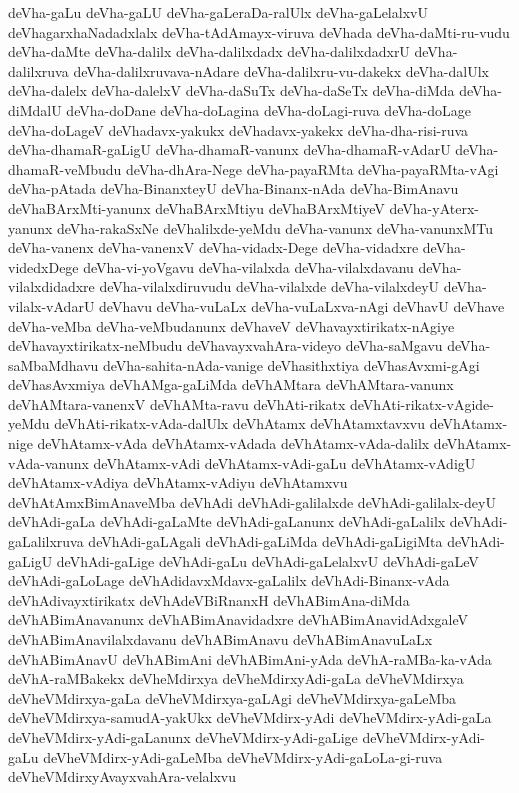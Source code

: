 {deVha-gaLu
deVha-gaLU
deVha-gaLeraDa-ralUlx
deVha-gaLelalxvU
deVhagarxhaNadadxlalx
deVha-tAdAmayx-viruva
deVhada
deVha-daMti-ru-vudu
deVha-daMte
deVha-dalilx
deVha-dalilxdadx
deVha-dalilxdadxrU
deVha-dalilxruva
deVha-dalilxruvava-nAdare
deVha-dalilxru-vu-dakekx
deVha-dalUlx
deVha-dalelx
deVha-dalelxV
deVha-daSuTx
deVha-daSeTx
deVha-diMda
deVha-diMdalU
deVha-doDane
deVha-doLagina
deVha-doLagi-ruva
deVha-doLage
deVha-doLageV
deVhadavx-yakukx
deVhadavx-yakekx
deVha-dha-risi-ruva
deVha-dhamaR-gaLigU
deVha-dhamaR-vanunx
deVha-dhamaR-vAdarU
deVha-dhamaR-veMbudu
deVha-dhAra-Nege
deVha-payaRMta
deVha-payaRMta-vAgi
deVha-pAtada
deVha-BinanxteyU
deVha-Binanx-nAda
deVha-BimAnavu
deVhaBArxMti-yanunx
deVhaBArxMtiyu
deVhaBArxMtiyeV
deVha-yAterx-yanunx
deVha-rakaSxNe
deVhalilxde-yeMdu
deVha-vanunx
deVha-vanunxMTu
deVha-vanenx
deVha-vanenxV
deVha-vidadx-Dege
deVha-vidadxre
deVha-videdxDege
deVha-vi-yoVgavu
deVha-vilalxda
deVha-vilalxdavanu
deVha-vilalxdidadxre
deVha-vilalxdiruvudu
deVha-vilalxde
deVha-vilalxdeyU
deVha-vilalx-vAdarU
deVhavu
deVha-vuLaLx
deVha-vuLaLxva-nAgi
deVhavU
deVhave
deVha-veMba
deVha-veMbudanunx
deVhaveV
deVhavayxtirikatx-nAgiye
deVhavayxtirikatx-neMbudu
deVhavayxvahAra-videyo
deVha-saMgavu
deVha-saMbaMdhavu
deVha-sahita-nAda-vanige
deVhasithxtiya
deVhasAvxmi-gAgi
deVhasAvxmiya
deVhAMga-gaLiMda
deVhAMtara
deVhAMtara-vanunx
deVhAMtara-vanenxV
deVhAMta-ravu
deVhAti-rikatx
deVhAti-rikatx-vAgide-yeMdu
deVhAti-rikatx-vAda-dalUlx
deVhAtamx
deVhAtamxtavxvu
deVhAtamx-nige
deVhAtamx-vAda
deVhAtamx-vAdada
deVhAtamx-vAda-dalilx
deVhAtamx-vAda-vanunx
deVhAtamx-vAdi
deVhAtamx-vAdi-gaLu
deVhAtamx-vAdigU
deVhAtamx-vAdiya
deVhAtamx-vAdiyu
deVhAtamxvu
deVhAtAmxBimAnaveMba
deVhAdi
deVhAdi-galilalxde
deVhAdi-galilalx-deyU
deVhAdi-gaLa
deVhAdi-gaLaMte
deVhAdi-gaLanunx
deVhAdi-gaLalilx
deVhAdi-gaLalilxruva
deVhAdi-gaLAgali
deVhAdi-gaLiMda
deVhAdi-gaLigiMta
deVhAdi-gaLigU
deVhAdi-gaLige
deVhAdi-gaLu
deVhAdi-gaLelalxvU
deVhAdi-gaLeV
deVhAdi-gaLoLage
deVhAdidavxMdavx-gaLalilx
deVhAdi-Binanx-vAda
deVhAdivayxtirikatx
deVhAdeVBiRnanxH
deVhABimAna-diMda
deVhABimAnavanunx
deVhABimAnavidadxre
deVhABimAnavidAdxgaleV
deVhABimAnavilalxdavanu
deVhABimAnavu
deVhABimAnavuLaLx
deVhABimAnavU
deVhABimAni
deVhABimAni-yAda
deVhA-raMBa-ka-vAda
deVhA-raMBakekx
deVheMdirxya
deVheMdirxyAdi-gaLa
deVheVMdirxya
deVheVMdirxya-gaLa
deVheVMdirxya-gaLAgi
deVheVMdirxya-gaLeMba
deVheVMdirxya-samudA-yakUkx
deVheVMdirx-yAdi
deVheVMdirx-yAdi-gaLa
deVheVMdirx-yAdi-gaLanunx
deVheVMdirx-yAdi-gaLige
deVheVMdirx-yAdi-gaLu
deVheVMdirx-yAdi-gaLeMba
deVheVMdirx-yAdi-gaLoLa-gi-ruva
deVheVMdirxyAvayxvahAra-velalxvu
}
